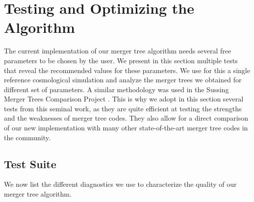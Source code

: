 \section{Testing and Optimizing the Algorithm}\label{chap:tests}

The current implementation of our merger tree algorithm needs several
free parameters to be chosen by the user. We present in this section
multiple tests that reveal the recommended values for these
parameters.  We use for this a single reference cosmological
simulation and analyze the merger trees we obtained for different set
of parameters.  A similar methodology was used in the Sussing Merger
Trees Comparison Project \citep{SUSSING_COMPARISON,
  SUSSING_CONVERGENCE, SUSSING_HALOFINDER,leeSussingMergerTrees2014a}.
This is why we adopt in this section several tests from this seminal
work, as they are quite efficient at testing the strengths and the
weaknesses of merger tree codes. They also allow for a direct
comparison of our new implementation with many other state-of-the-art
merger tree codes in the community.

\subsection{Test Suite}\label{chap:testing_methods}

We now list the different diagnostics we use to characterize the quality of
our merger tree algorithm.

